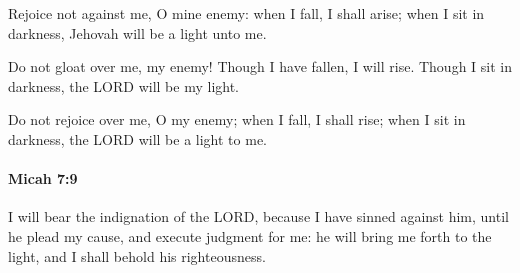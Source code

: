 			\begin{versebox}
					\item[BHS] 
					\item[LXX] 
					\item[ASV] Rejoice not against me, O mine enemy: when I fall, I shall arise; when I sit in darkness, Jehovah will be a light unto me.
					\item[NIV] Do not gloat over me, my enemy! Though I have fallen, I will rise. Though I sit in darkness, the LORD will be my light.
					\item[NRSV] Do not rejoice over me, O my enemy; when I fall, I shall rise; when I sit in darkness, the LORD will be a light to me.
			\end{versebox}

		\paragraph{Micah 7:9} %
			\label{MICAH-7-9}

			I will bear the indignation of the LORD, because I have sinned against him, until he plead my cause, and execute judgment for me: he will bring me forth to the light, and I shall behold his righteousness.


